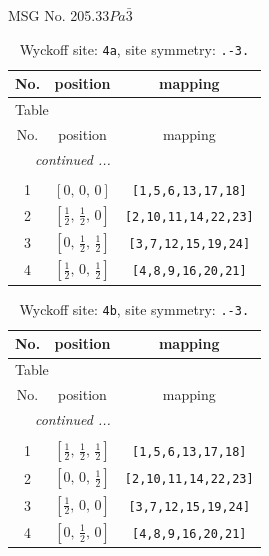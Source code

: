\documentclass[fleqn,8pt]{jsarticle}
\begin{document}
\setcounter{MaxMatrixCols}{32}

\renewcommand{\tablename}{Table~}
\renewcommand{\figurename}{Figure~}
\begin{center}
\LARGE
MSG No. 205.33\quad$Pa\bar{3}$
\end{center}
\renewcommand{\arraystretch}{1.2}
\begin{longtable}{ccc}
\caption{Wyckoff site: {\tt 4a}, site symmetry: {\tt .-3.}}
 \\
 \hline \hline
No. & position & mapping \\ \hline \endfirsthead

\multicolumn{2}{l}{\tablename\ \thetable{}} \\
 \hline \hline
No. & position & mapping \\ \hline \endhead

 \hline \hline
\multicolumn{2}{r}{\footnotesize\it continued ...} \\ \endfoot

 \hline \hline
\multicolumn{2}{r}{} \\ \endlastfoot

1 & $\left[ 0,\, 0,\, 0 \right]$ & {\tt [1,5,6,13,17,18]} \\ \hline
2 & $\left[ \frac{1}{2},\, \frac{1}{2},\, 0 \right]$ & {\tt [2,10,11,14,22,23]} \\ \hline
3 & $\left[ 0,\, \frac{1}{2},\, \frac{1}{2} \right]$ & {\tt [3,7,12,15,19,24]} \\ \hline
4 & $\left[ \frac{1}{2},\, 0,\, \frac{1}{2} \right]$ & {\tt [4,8,9,16,20,21]} \\
\end{longtable}
\renewcommand{\arraystretch}{1.2}
\begin{longtable}{ccc}
\caption{Wyckoff site: {\tt 4b}, site symmetry: {\tt .-3.}}
 \\
 \hline \hline
No. & position & mapping \\ \hline \endfirsthead

\multicolumn{2}{l}{\tablename\ \thetable{}} \\
 \hline \hline
No. & position & mapping \\ \hline \endhead

 \hline \hline
\multicolumn{2}{r}{\footnotesize\it continued ...} \\ \endfoot

 \hline \hline
\multicolumn{2}{r}{} \\ \endlastfoot

1 & $\left[ \frac{1}{2},\, \frac{1}{2},\, \frac{1}{2} \right]$ & {\tt [1,5,6,13,17,18]} \\ \hline
2 & $\left[ 0,\, 0,\, \frac{1}{2} \right]$ & {\tt [2,10,11,14,22,23]} \\ \hline
3 & $\left[ \frac{1}{2},\, 0,\, 0 \right]$ & {\tt [3,7,12,15,19,24]} \\ \hline
4 & $\left[ 0,\, \frac{1}{2},\, 0 \right]$ & {\tt [4,8,9,16,20,21]} \\
\end{longtable}
\end{document}
